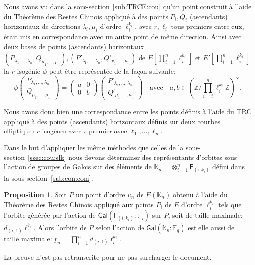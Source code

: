 \documentclass[10pt,a4paper]{book}
\theoremstyle{plain}
\theoremstyle{definition}
\theoremstyle{definition}
\theoremstyle{definition}
\theoremstyle{definition}
\newtheorem{prop}[thm]{Proposition}
\theoremstyle{definition}
\theoremstyle{remark}
\theoremstyle{remark}
\theoremstyle{definition}
\begin{document}
\label{sss:crt:cou}
Nous avons vu dans la sous-section~\ref{sub:TRCE:cou} 
qu'un point construit à l'aide du Théorème des Restes Chinois appliqué à des 
points $P_i,Q_i$ (ascendants) horizontaux de directions $\lambda_i,\mu_i$  
d'ordre $\ell_i^{k_i}$, avec $r, \ell_i$ tous premiers entre eux, 
était mis en correspondance avec un autre point de même direction.
Ainsi avec deux bases de points (ascendants) horizontaux $(P_{\lambda_1,
\dots, \lambda_n},Q_{\mu_1, \dots, \mu_n}),(P'_{\lambda_1, \dots, \lambda_n}
 , Q'_{\mu_1, \dots, \mu_n})$ de $E[\prod_{i=1}^n\ell_i^{k_i}]$ et 
 $E'[\prod_{i=1}^n\ell_i^{k_i}]$ la $r$-isogénie $\phi$ peut être 
 représentée de la façon suivante:  
 \begin{equation*}
 \phi
\left(
\begin{matrix}
P_{\lambda_1, \dots, \lambda_n} \\
Q_{\mu_1, \dots, \mu_n}
\end{matrix}
\right)= \left(\begin{matrix}
a & 0 \\
0 & b
\end{matrix} \right)
\left(
\begin{matrix}
 P'_{\lambda_1, \dots, \lambda_n} \\
 Q'_{\mu_1, \dots,  \mu_n} 
\end{matrix}
\right)
\quad \text{avec} \quad a,b \in \left( \mathbb{Z}/\prod_{i=i}^n\ell_i^{k_i}\mathbb{Z} \right)^{\times}.
\end{equation*}

Nous avons donc bien une correspondance entre les points définis à l'aide du 
TRC appliqué à des points (ascendants) horizontaux définis 
sur deux courbes elliptiques $r$-isogènes avec $r$ premier avec $\ell_1, \dots
, \ell_n$.
 
Dans le but d'appliquer les même méthodes que celles de la 
sous-section~\ref{ssec:cou:elk} nous devons déterminer des représentants 
d'orbites sous l'action de groupes de Galois sur des éléments de 
$\mathbb{K}_n=\otimes_{i=1}^{n}\mathsf{F}_{(i,k_i)}$
défini dans la sous-section~\ref{sub:con:com}.
\begin{prop}
\label{pro:rep:com}
Soit $P$ un point d'ordre $\upsilon_n$ de $E(\mathbb{K}_n)$ obtenu à l'aide 
du Théorème des Restes Chinois appliqué aux points $P_i$ de $E$ d'ordre 
$\ell_i^{k_i}$ tels que l'orbite générée par l'action de 
$\mathsf{Gal}(\mathsf{F}_{(i,k_i)}:\mathbb{F}_q)$ sur $P_i$ soit de taille
 maximale: $d_{(i,1)}\ell_i^{k_i}$.  Alors l'orbite de $P$ selon l'action de 
 $\mathsf{Gal}(\mathbb{K}_n:\mathbb{F}_q)$ est elle aussi de taille maximale:
 $p_n=\prod_{i=1}^nd_{(i,1)}\ell_i^{k_i}$.
\end{prop} 
La preuve n'est pas retranscrite pour ne pas surcharger le document.
\end{document}
